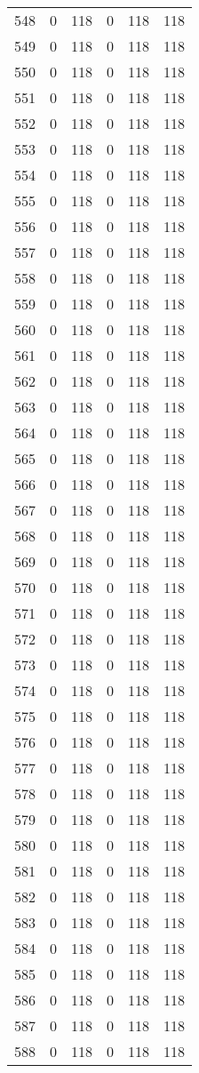 \documentclass[a4paper]{ctexart}
\begin{document}
\begin{longtable}{p{1cm}|p{2cm}|p{2cm}|p{2cm}|P{2cm}|p{2cm}}
		548&0&118&0&118&118\\
		549&0&118&0&118&118\\
		550&0&118&0&118&118\\
		551&0&118&0&118&118\\
		552&0&118&0&118&118\\
		553&0&118&0&118&118\\
		554&0&118&0&118&118\\
		555&0&118&0&118&118\\
		556&0&118&0&118&118\\
		557&0&118&0&118&118\\
		558&0&118&0&118&118\\
		559&0&118&0&118&118\\
		560&0&118&0&118&118\\
		561&0&118&0&118&118\\
		562&0&118&0&118&118\\
		563&0&118&0&118&118\\
		564&0&118&0&118&118\\
		565&0&118&0&118&118\\
		566&0&118&0&118&118\\
		567&0&118&0&118&118\\
		568&0&118&0&118&118\\
		569&0&118&0&118&118\\
		570&0&118&0&118&118\\
		571&0&118&0&118&118\\
		572&0&118&0&118&118\\
		573&0&118&0&118&118\\
		574&0&118&0&118&118\\
		575&0&118&0&118&118\\
		576&0&118&0&118&118\\
		577&0&118&0&118&118\\
		578&0&118&0&118&118\\
		579&0&118&0&118&118\\
		580&0&118&0&118&118\\
		581&0&118&0&118&118\\
		582&0&118&0&118&118\\
		583&0&118&0&118&118\\
		584&0&118&0&118&118\\
		585&0&118&0&118&118\\
		586&0&118&0&118&118\\
		587&0&118&0&118&118\\
		588&0&118&0&118&118\\

\end{longtable}
\end{document}
